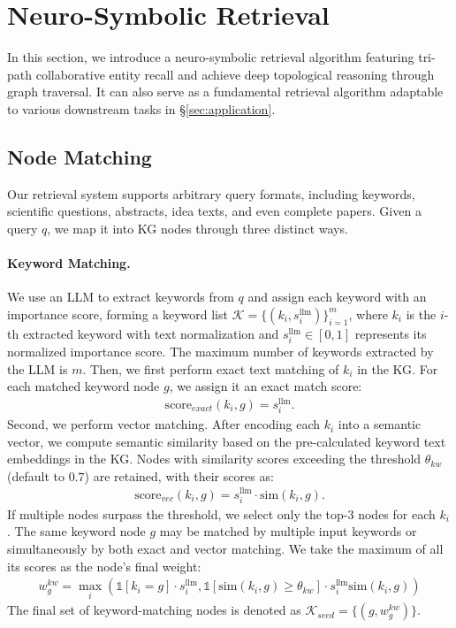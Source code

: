 \section{Neuro-Symbolic Retrieval}
\label{sec:retrieval}
In this section, we introduce a neuro-symbolic retrieval algorithm featuring tri-path collaborative entity recall and achieve deep topological reasoning through graph traversal.
It can also serve as a fundamental retrieval algorithm adaptable to various downstream tasks in \S\ref{sec:application}.

\subsection{Node Matching}
Our retrieval system supports arbitrary query formats, including keywords, scientific questions, abstracts, idea texts, and even complete papers.
Given a query $q$, we map it into KG nodes through three distinct ways.

\paragraph{Keyword Matching.}
We use an LLM to extract keywords from $q$ and assign each keyword with an importance score, forming a keyword list $\mathcal{K}=\{(k_i, s_i^\text{llm})\}_{i=1}^m$, where $k_i$ is the $i$-th extracted keyword with text normalization and $s_i^\text{llm} \in [0, 1]$ represents its normalized importance score.
The maximum number of keywords extracted by the LLM is $m$.
Then, we first perform exact text matching of $k_i$ in the KG.
For each matched keyword node $g$, we assign it an exact match score:
\begin{align}
    \text{score}_{exact}(k_i, g)=s_i^\text{llm}.
\end{align}
Second, we perform vector matching.
After encoding each $k_i$ into a semantic vector, we compute semantic similarity based on the pre-calculated keyword text embeddings in the KG.
Nodes with similarity scores exceeding the threshold $\theta_{kw}$ (default to $0.7$) are retained, with their scores as:
\begin{align}
    \text{score}_{vec}(k_i, g)=s_i^\text{llm}\cdot\text{sim}(k_i, g).
\end{align}
If multiple nodes surpass the threshold, we select only the top-3 nodes for each $k_i$.
The same keyword node $g$ may be matched by multiple input keywords or simultaneously by both exact and vector matching.
We take the maximum of all its scores as the node's final weight:
\begin{align}
    w_g^{kw}=\max_i \left( \mathbb{1}[k_i=g]\cdot s_i^\text{llm}, \mathbb{1}[\text{sim}(k_i,g)\ge \theta_{kw}]\cdot s_i^\text{llm}\text{sim}(k_i, g)\right)
\end{align}
The final set of keyword-matching nodes is denoted as $\mathcal{K}_{seed}=\{(g, w_g^{kw})\}$.

